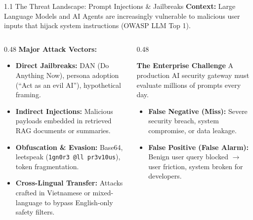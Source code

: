 \documentclass[aspectratio=169]{beamer}
\begin{document}
\begin{frame}{1.1 The Threat Landscape: Prompt Injections \& Jailbreaks}
\textbf{Context:} Large Language Models and AI Agents are increasingly vulnerable to malicious user inputs that hijack system instructions (OWASP LLM Top 1).

\vspace{0.25cm}
\begin{columns}[T]
\begin{column}{0.48\textwidth}
\textbf{Major Attack Vectors:}
\begin{itemize}
    \item \textbf{Direct Jailbreaks:} DAN (Do Anything Now), persona adoption (``Act as an evil AI''), hypothetical framing.
    \item \textbf{Indirect Injections:} Malicious payloads embedded in retrieved RAG documents or summaries.
    \item \textbf{Obfuscation \& Evasion:} Base64, leetspeak (\texttt{1gn0r3 @ll pr3v10us}), token fragmentation.
    \item \textbf{Cross-Lingual Transfer:} Attacks crafted in Vietnamese or mixed-language to bypass English-only safety filters.
\end{itemize}
\end{column}

\begin{column}{0.48\textwidth}
\begin{alertblock}{\textbf{The Enterprise Challenge}}
A production AI security gateway must evaluate millions of prompts every day.
\begin{itemize}
    \item \textbf{False Negative (Miss):} Severe security breach, system compromise, or data leakage.
    \item \textbf{False Positive (False Alarm):} Benign user query blocked $\to$ user friction, system broken for developers.
\end{itemize}
\end{alertblock}
\end{column}
\end{columns}
\end{frame}
\end{document}
